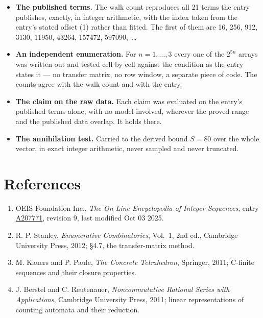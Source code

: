 \documentclass[11pt]{article}
\theoremstyle{definition}
\begin{document}
\begin{itemize}

\item {\bfseries The published terms.} The walk count reproduces all 21 terms the entry publishes, exactly, in integer arithmetic, with the index taken from the entry's stated offset (1) rather than fitted. The first of them are 16, 256, 912, 3130, 11950, 43264, 157472, 597090,~\dots

\item {\bfseries An independent enumeration.} For $n = 1,\dots,3$ every one of the $2^{5n}$ arrays was written out and tested cell by cell against the condition as the entry states it --- no transfer matrix, no row window, a separate piece of code. The counts agree with the walk count and with the entry.

\item {\bfseries The claim on the raw data.} Each claim was evaluated on the entry's published terms alone, with no model involved, wherever the proved range and the published data overlap. It holds there.

\item {\bfseries The annihilation test.} Carried to the derived bound $S = 80$ over the whole vector, in exact integer arithmetic, never sampled and never truncated.

\end{itemize}

\section{References}

\begin{enumerate}

\item OEIS Foundation Inc., \emph{The On-Line Encyclopedia of Integer Sequences}, entry \href{https://oeis.org/A207771}{A207771}, revision 9, last modified Oct 03 2025.

\item R. P. Stanley, \emph{Enumerative Combinatorics}, Vol.~1, 2nd ed., Cambridge University Press, 2012; \S4.7, the transfer-matrix method.

\item M. Kauers and P. Paule, \emph{The Concrete Tetrahedron}, Springer, 2011; C-finite sequences and their closure properties.

\item J. Berstel and C. Reutenauer, \emph{Noncommutative Rational Series with Applications}, Cambridge University Press, 2011; linear representations of counting automata and their reduction.

\end{enumerate}
\end{document}
